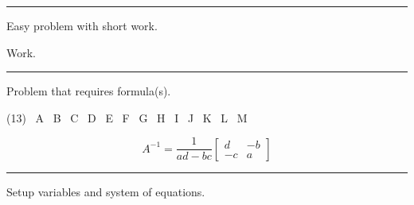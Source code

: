 \noindent\rule{\textwidth}{1pt}

\begin{question}[class=Z]{3}
  \label{question:easy-problem}
  Easy problem with short work.
\end{question}
\begin{minipage}{0.75\textwidth}
  \begin{solution}
    Work.
  \end{solution}
\end{minipage}\hspace{\fill}%
\begin{minipage}{0.25\textwidth}
  \vspace{0.1in}
\end{minipage}

\noindent\rule{\textwidth}{1pt}

\begin{question}[class=Z]{6}
  \label{question:formula-problem}
  Problem that requires formula(s).
  \begin{tasks}(13)
    \task[\selectall] \ A
    \task[\selectall] \ B
    \task[\selectall] \ C
    \task[\selectall] \ D
    \task[\selectall] \ E
    \task[\selectall] \ F
    \task[\selectall] \ G
    \task[\correctselectall] \ H
    \task[\selectall] \ I
    \task[\selectall] \ J
    \task[\selectall] \ K
    \task[\selectall] \ L
    \task[\selectall] \ M
  \end{tasks}
\end{question}
\begin{minipage}{0.75\textwidth}
  \begin{solution}
    \[A^{-1} = \dfrac{1}{ad - bc}
      \begin{bmatrix}
        d & -b \\
        -c & a
      \end{bmatrix}
    \]
  \end{solution}
\end{minipage}\hspace{\fill}%
\begin{minipage}{0.25\textwidth}
  \vspace{0.5in}
  \vspace{0.1in}
\end{minipage}

\noindent\rule{\textwidth}{1pt}

\begin{question}[class=Z]{6}
  \label{question:setup-system}
  Setup variables and system of equations.\\[0.2in]
  \begin{minipage}{0.45\textwidth}
  \end{minipage}\hspace{\fill}%
  \begin{minipage}{0.45\textwidth}
  \end{minipage}
\end{question}

